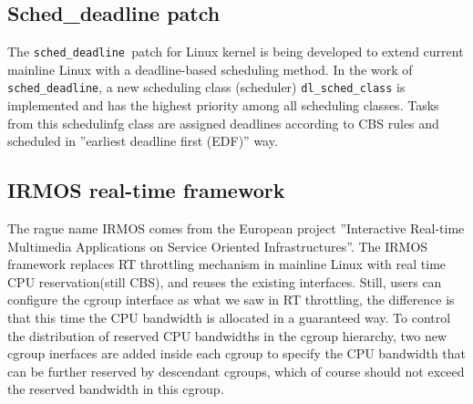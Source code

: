 \subsection{Sched\_deadline patch\label{sec:RelatedWork_dl}}
The \texttt{sched\_deadline }patch for Linux kernel is being developed 
to extend current mainline Linux with a deadline-based scheduling method. 
In the work of \texttt{sched\_deadline}, a new scheduling class (scheduler) 
\texttt{dl\_sched\_class} is implemented and has the highest priority among 
all scheduling classes. Tasks from this schedulinfg class are assigned 
deadlines according to CBS rules and scheduled in ''earliest deadline first
(EDF)'' way.

\subsection{IRMOS real-time framework\label{sec:RelatedWork_irmos}}
The rague name IRMOS comes from the European project ''Interactive Real-time
Multimedia Applications on Service Oriented Infrastructures''. 
The IRMOS framework replaces RT throttling mechanism in mainline Linux with 
real time CPU reservation(still CBS), and reuses the existing interfaces. 
Still, users can configure the cgroup interface as what we saw in RT 
throttling, the difference is that this time the CPU 
bandwidth is allocated in a guaranteed way. To control the distribution of 
reserved CPU bandwidths in the cgroup hierarchy, two new cgroup inerfaces
are added inside each cgroup to specify the CPU bandwidth that can be 
further reserved by descendant cgroups, which of course should not exceed 
the reserved bandwidth in this cgroup.


